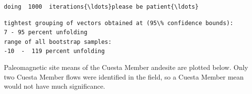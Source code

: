 \documentclass{article}
\begin{document}
    \begin{Verbatim}[commandchars=\\\{\}]
doing  1000  iterations{\ldots}please be patient{\ldots}
    \end{Verbatim}

    \begin{center}
    \end{center}
    
    \begin{center}
    \end{center}
    
    \begin{Verbatim}[commandchars=\\\{\}]
tightest grouping of vectors obtained at (95\% confidence bounds):
7 - 95 percent unfolding
range of all bootstrap samples: 
-10  -  119 percent unfolding
    \end{Verbatim}

    \begin{center}
    \end{center}
    
    Paleomagnetic site means of the Cuesta Member andesite are plotted
below. Only two Cuesta Member flows were identified in the field, so a
Cuesta Member mean would not have much significance.
\end{document}
